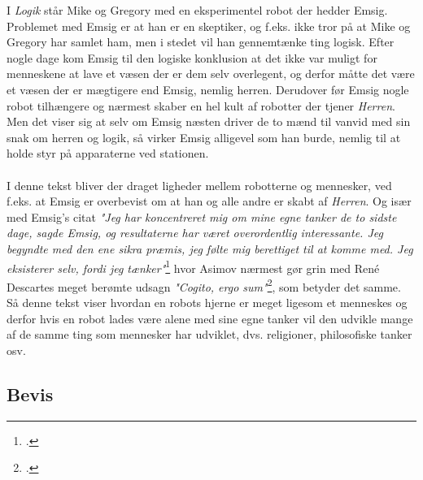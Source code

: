 I \textit{Logik} står Mike og Gregory med en eksperimentel robot der hedder Emsig. Problemet med Emsig er at han er en skeptiker, og f.eks. ikke tror på at Mike og Gregory
har samlet ham, men i stedet vil han gennemtænke ting logisk. Efter nogle dage kom Emsig til den logiske konklusion at det ikke var muligt for menneskene at lave et væsen
der er dem selv overlegent, og derfor måtte det være et væsen der er mægtigere end Emsig, nemlig herren. Derudover før Emsig nogle robot tilhængere og nærmest skaber
en hel kult af robotter der tjener \textit{Herren}. Men det viser sig at selv om Emsig næsten driver de to mænd til vanvid med sin snak om herren og logik, så virker
Emsig alligevel som han burde, nemlig til at holde styr på apparaterne ved stationen.
\\
\\
I denne tekst bliver der draget ligheder mellem robotterne og mennesker, ved f.eks. at Emsig er overbevist om at han og alle andre er skabt af \textit{Herren}.
Og især med Emsig's citat \textit{"Jeg har koncentreret mig om mine egne tanker de to sidste dage, sagde Emsig, og resultaterne har været overordentlig
interessante. Jeg begyndte med den ene sikra præmis, jeg følte mig berettiget til at komme med. Jeg eksisterer selv, fordi jeg tænker"}\footcite[62, l. 25]{robot} hvor Asimov nærmest
gør grin med René Descartes meget berømte udsagn \textit{"Cogito, ergo sum"}\footcite{rene}, som betyder det samme. Så denne tekst viser hvordan en robots hjerne er meget ligesom et menneskes og derfor
hvis en robot lades være alene med sine egne tanker vil den udvikle mange af de samme ting som mennesker har udviklet, dvs. religioner, philosofiske tanker osv.

\subsection{Bevis}

